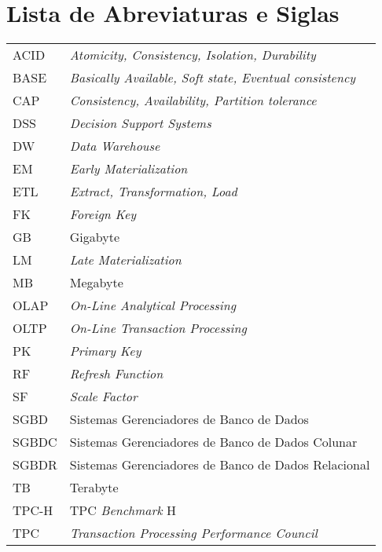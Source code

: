 
\pagebreak
{}
\listoffigures

\pagebreak
{}
\listoftables

\pagebreak
{}
\chapter*{Lista de Abreviaturas e Siglas}
\begin{tabular}{ll}
ACID & \textit{Atomicity, Consistency, Isolation, Durability} \\
BASE & \textit{Basically Available, Soft state, Eventual consistency} \\
CAP & \textit{Consistency, Availability, Partition tolerance} \\
DSS & \textit{Decision Support Systems}\\
DW & \textit{Data Warehouse}\\
EM & \textit{Early Materialization} \\
ETL & \textit{Extract, Transformation, Load} \\
FK & \textit{Foreign Key}\\
GB & Gigabyte \\
LM & \textit{Late Materialization} \\
MB & Megabyte \\
OLAP & \textit{On-Line Analytical Processing}\\
OLTP & \textit{On-Line Transaction Processing}\\
PK & \textit{Primary Key}\\
RF & \textit{Refresh Function} \\
SF & \textit{Scale Factor}\\
SGBD & Sistemas Gerenciadores de Banco de Dados\\
SGBDC & Sistemas Gerenciadores de Banco de Dados Colunar \\
SGBDR & Sistemas Gerenciadores de Banco de Dados Relacional\\
TB & Terabyte \\
TPC-H & TPC \textit{Benchmark} H \\
TPC & \textit{Transaction Processing Performance Council}\\

\end{tabular}

